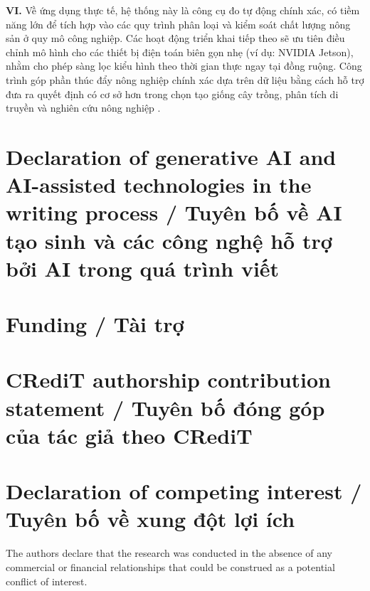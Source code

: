 \documentclass[final,1p,11pt,longtitle]{elsarticle}
\newenvironment{viet}{\par\smallskip\begingroup\color{viColor}\noindent\textbf{VI. }\ignorespaces}{\par\endgroup\smallskip}
\begin{document}
\begin{viet}
Về ứng dụng thực tế, hệ thống này là công cụ đo tự động chính xác, có tiềm năng lớn để tích hợp vào các quy trình phân loại và kiểm soát chất lượng nông sản ở quy mô công nghiệp. Các hoạt động triển khai tiếp theo sẽ ưu tiên điều chỉnh mô hình cho các thiết bị điện toán biên gọn nhẹ (ví dụ: NVIDIA Jetson), nhằm cho phép sàng lọc kiểu hình theo thời gian thực ngay tại đồng ruộng. Công trình góp phần thúc đẩy nông nghiệp chính xác dựa trên dữ liệu bằng cách hỗ trợ đưa ra quyết định có cơ sở hơn trong chọn tạo giống cây trồng, phân tích di truyền và nghiên cứu nông nghiệp \cite{next}.
\end{viet}



\section*{Declaration of generative AI and AI-assisted technologies in the writing process / {\color{viColor} Tuyên bố về AI tạo sinh và các công nghệ hỗ trợ bởi AI trong quá trình viết}}

\section*{Funding / {\color{viColor} Tài trợ}}

\section*{CRediT authorship contribution statement / {\color{viColor} Tuyên bố đóng góp của tác giả theo CRediT}}

\section*{Declaration of competing interest / {\color{viColor} Tuyên bố về xung đột lợi ích}}
The authors declare that the research was conducted in the absence of any commercial or financial relationships that could be construed as a potential conflict of interest.
\end{document}
